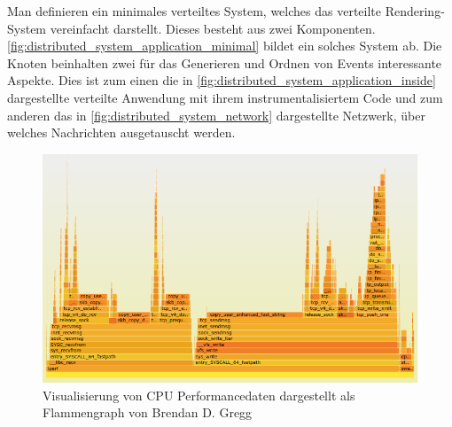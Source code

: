 Man definieren ein minimales verteiltes System, welches das verteilte Rendering-System vereinfacht darstellt. Dieses besteht aus zwei Komponenten. \cref{fig:distributed_system_application_minimal} bildet ein solches System ab. Die Knoten beinhalten zwei für das Generieren und Ordnen von Events interessante Aspekte. Dies ist zum einen die in \cref{fig:distributed_system_application_inside} dargestellte verteilte Anwendung mit ihrem instrumentalisiertem Code und zum anderen das in \cref{fig:distributed_system_network} dargestellte Netzwerk, über welches Nachrichten ausgetauscht werden. 

 \begin{figure}[!ht]
	\centering
	\includegraphics[scale=0.5]{img/Problembeschreibung/problembeschreibung_flamengraph.png}
	\caption[Visualisierung von CPU Performancedaten]{Visualisierung von CPU Performancedaten dargestellt als Flammengraph von Brendan D. Gregg \cite{BrendanGregg2011}}
	\label{fig:problembeschreibung_flamengraph}
\end{figure}

